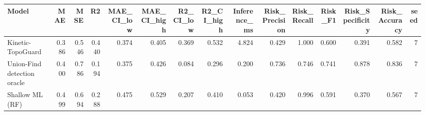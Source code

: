 \begin{tabular}{lrrrrrrrrrrrrrr}
\toprule
Model & MAE & MSE & R2 & MAE\_CI\_low & MAE\_CI\_high & R2\_CI\_low & R2\_CI\_high & Inference\_ms & Risk\_Precision & Risk\_Recall & Risk\_F1 & Risk\_Specificity & Risk\_Accuracy & seed \\
\midrule
Kinetic-TopoGuard & 0.386 & 0.546 & 0.440 & 0.374 & 0.405 & 0.369 & 0.532 & 4.824 & 0.429 & 1.000 & 0.600 & 0.391 & 0.582 & 7 \\
Union-Find detection oracle & 0.400 & 0.786 & 0.194 & 0.375 & 0.426 & 0.084 & 0.296 & 0.200 & 0.736 & 0.746 & 0.741 & 0.878 & 0.836 & 7 \\
Shallow ML (RF) & 0.499 & 0.694 & 0.288 & 0.475 & 0.529 & 0.207 & 0.410 & 0.053 & 0.420 & 0.996 & 0.591 & 0.370 & 0.567 & 7 \\
\bottomrule
\end{tabular}
